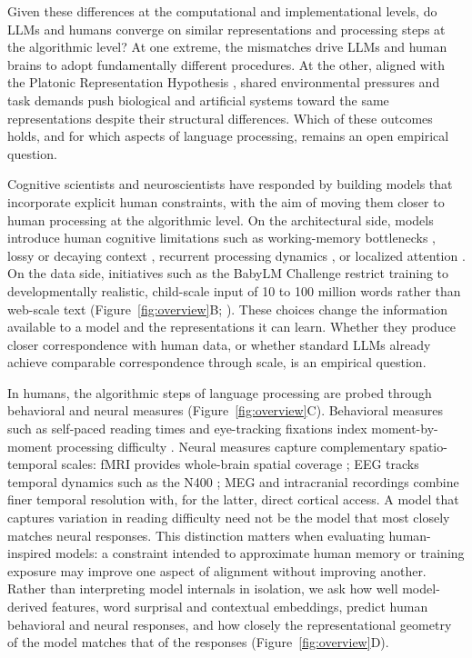 Given these differences at the computational and implementational levels, do LLMs and humans converge on similar representations and processing steps at the algorithmic level? At one extreme, the mismatches drive LLMs and human brains to adopt fundamentally different procedures. At the other, aligned with the Platonic Representation Hypothesis \citep{huh2024platonic}, shared environmental pressures and task demands push biological and artificial systems toward the same representations despite their structural differences. Which of these outcomes holds, and for which aspects of language processing, remains an open empirical question.

Cognitive scientists and neuroscientists have responded by building models that incorporate explicit human constraints, with the aim of moving them closer to human processing at the algorithmic level. On the architectural side, models introduce human cognitive limitations such as working-memory bottlenecks \citep{lewisvasishth2005activation}, lossy or decaying context \citep{futrell2020lossy}, recurrent processing dynamics \citep{michaelov2024revenge}, or localized attention \citep{devarda2024locally,kuribayashi2022context}. On the data side, initiatives such as the BabyLM Challenge restrict training to developmentally realistic, child-scale input of 10 to 100 million words rather than web-scale text (Figure~\ref{fig:overview}B; \citealp{warstadt2023cfp,warstadt2023findings}). These choices change the information available to a model and the representations it can learn. Whether they produce closer correspondence with human data, or whether standard LLMs already achieve comparable correspondence through scale, is an empirical question.

In humans, the algorithmic steps of language processing are probed through behavioral and neural measures (Figure~\ref{fig:overview}C). Behavioral measures such as self-paced reading times and eye-tracking fixations index moment-by-moment processing difficulty \citep{futrell2021natural,frank2013reading,luke2018provo,siegelman2022meco}. Neural measures capture complementary spatio-temporal scales: fMRI provides whole-brain spatial coverage \citep{schrimpf2021neural}; EEG tracks temporal dynamics such as the N400 \citep{michaelov2024strong,federmeier2007multiple}; MEG and intracranial recordings combine finer temporal resolution with, for the latter, direct cortical access. A model that captures variation in reading difficulty need not be the model that most closely matches neural responses. This distinction matters when evaluating human-inspired models: a constraint intended to approximate human memory or training exposure may improve one aspect of alignment without improving another. Rather than interpreting model internals in isolation, we ask how well model-derived features, word surprisal and contextual embeddings, predict human behavioral and neural responses, and how closely the representational geometry of the model matches that of the responses (Figure~\ref{fig:overview}D).

